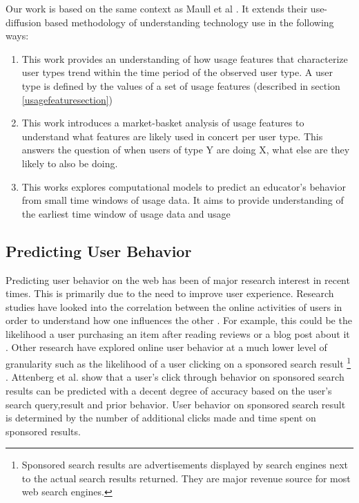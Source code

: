 \documentclass{acm_proc_article-sp}
\begin{document}
Our work is based on the same context as Maull et al \cite{maullunderstanding}. It extends their use-diffusion based methodology of understanding technology use in the following ways: 
\begin{enumerate}
\item This work provides an understanding of how usage features that characterize user types trend within the time period of the observed user type. A user type is defined by the values of a set of usage features (described in section \ref{usagefeaturesection})

\item This work introduces a market-basket analysis of usage features to understand what features are likely used in concert per user type. This answers the question of when users of type Y are doing X, what else are they likely to also be doing.

\item This works explores computational models to predict an educator's behavior from small time windows of usage data. It aims to provide understanding of the earliest time window of usage data and usage
\end{enumerate}

\subsection{Predicting User Behavior}
Predicting user behavior on the web has been of major research interest in recent times. This is primarily due to the need to improve user experience.  Research studies have looked into the correlation between  the online activities of users in order to understand how one influences the other \cite{adar2007we}. For example, this could be the likelihood a user purchasing an item after reading reviews or a blog post about it \cite{adar2007we}. Other research have explored online user behavior at a much lower level of granularity such as the likelihood of a user clicking on a sponsored search result \footnote{Sponsored search results are advertisements displayed by search engines next to the actual search results returned. They are major revenue source for most web search engines.} \cite{Attenberg:2009}. Attenberg et al. \cite{Attenberg:2009} show that a user's click through behavior on sponsored search results can be predicted with a decent degree of accuracy based on the user's search query,result and prior behavior. User behavior on sponsored search result is determined by the number of additional clicks made and time spent on sponsored results.
\end{document}
